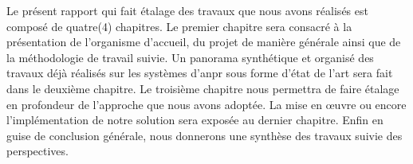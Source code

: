 Le présent rapport qui fait étalage des travaux que nous avons réalisés est composé de quatre(4) chapitres. Le premier chapitre sera consacré à la présentation de l’organisme d’accueil, du projet de manière générale ainsi que de la méthodologie de travail suivie. Un panorama synthétique et organisé des travaux déjà réalisés sur les systèmes d’\acrshort{anpr} sous forme d'état de l’art sera fait dans le deuxième chapitre. Le troisième chapitre nous permettra de faire étalage en profondeur de l’approche que nous avons adoptée. La mise en œuvre ou encore l’implémentation de notre solution sera exposée au dernier chapitre. Enfin en guise de conclusion générale, nous donnerons une synthèse des travaux suivie des perspectives.